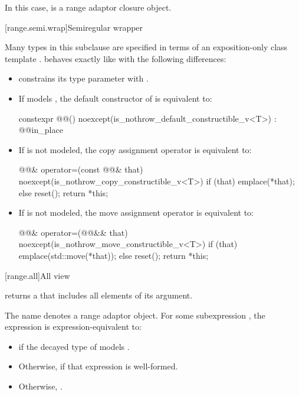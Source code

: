 In this case,  is a range adaptor
closure object.

[range.semi.wrap]{Semiregular wrapper}

\pnum
Many types in this subclause are specified in terms of
an exposition-only class template .
 behaves exactly like 
with the following differences:
\begin{itemize}
\item {} constrains
its type parameter  with
.

\item If  models , the default
constructor of  is equivalent to:
\begin{codeblock}
constexpr @@() noexcept(is_nothrow_default_constructible_v<T>)
  : @@{in_place}
{ }
\end{codeblock}

\item If  is not
modeled, the copy assignment operator is equivalent to:
\begin{codeblock}
@@& operator=(const @@& that)
  noexcept(is_nothrow_copy_constructible_v<T>)
{
  if (that) emplace(*that);
  else reset();
  return *this;
}
\end{codeblock}

\item If  is not modeled,
the move assignment operator is equivalent to:
\begin{codeblock}
@@& operator=(@@&& that)
  noexcept(is_nothrow_move_constructible_v<T>)
{
  if (that) emplace(std::move(*that));
  else reset();
  return *this;
}
\end{codeblock}
\end{itemize}

[range.all]{All view}

\pnum
{} returns a  that includes all elements of
its  argument.

\pnum
The name  denotes a
range adaptor object.
For some subexpression , the expression
 is expression-equivalent to:
\begin{itemize}
\item {} if the decayed type of 
models .

\item Otherwise,  if that expression is well-formed.

\item Otherwise, .
\end{itemize}

